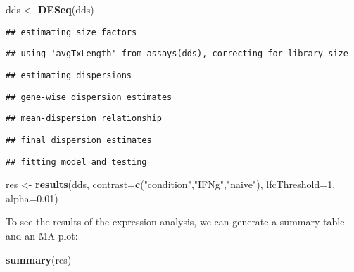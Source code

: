 \documentclass[
  9pt,
  a4paper,
]{extarticle}
\newenvironment{Shaded}{\begin{snugshade}}{\end{snugshade}}
\newcommand{\DataTypeTok}[1]{\textcolor[rgb]{0.13,0.29,0.53}{#1}}
\newcommand{\DecValTok}[1]{\textcolor[rgb]{0.00,0.00,0.81}{#1}}
\newcommand{\FloatTok}[1]{\textcolor[rgb]{0.00,0.00,0.81}{#1}}
\newcommand{\KeywordTok}[1]{\textcolor[rgb]{0.13,0.29,0.53}{\textbf{#1}}}
\newcommand{\NormalTok}[1]{#1}
\newcommand{\StringTok}[1]{\textcolor[rgb]{0.31,0.60,0.02}{#1}}
\begin{document}
\begin{Shaded}
\begin{Highlighting}[]
\NormalTok{dds <-}\StringTok{ }\KeywordTok{DESeq}\NormalTok{(dds)}
\end{Highlighting}
\end{Shaded}

\begin{verbatim}
## estimating size factors
\end{verbatim}

\begin{verbatim}
## using 'avgTxLength' from assays(dds), correcting for library size
\end{verbatim}

\begin{verbatim}
## estimating dispersions
\end{verbatim}

\begin{verbatim}
## gene-wise dispersion estimates
\end{verbatim}

\begin{verbatim}
## mean-dispersion relationship
\end{verbatim}

\begin{verbatim}
## final dispersion estimates
\end{verbatim}

\begin{verbatim}
## fitting model and testing
\end{verbatim}

\begin{Shaded}
\begin{Highlighting}[]
\NormalTok{res <-}\StringTok{ }\KeywordTok{results}\NormalTok{(dds,}
               \DataTypeTok{contrast=}\KeywordTok{c}\NormalTok{(}\StringTok{"condition"}\NormalTok{,}\StringTok{"IFNg"}\NormalTok{,}\StringTok{"naive"}\NormalTok{),}
               \DataTypeTok{lfcThreshold=}\DecValTok{1}\NormalTok{, }\DataTypeTok{alpha=}\FloatTok{0.01}\NormalTok{)}
\end{Highlighting}
\end{Shaded}

To see the results of the expression analysis, we can generate a summary table
and an MA plot:

\begin{Shaded}
\begin{Highlighting}[]
\KeywordTok{summary}\NormalTok{(res)}
\end{Highlighting}
\end{Shaded}
\end{document}
